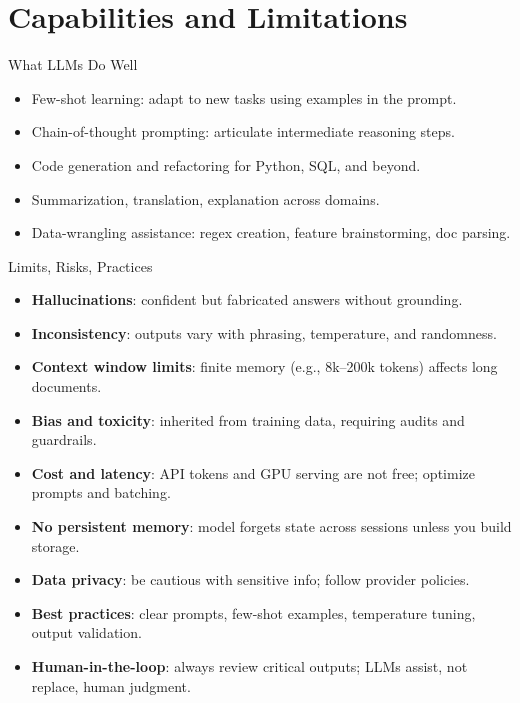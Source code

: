 \documentclass[aspectratio=169]{beamer}
\begin{document}
\section{Capabilities and Limitations}

\begin{frame}{What LLMs Do Well}
  \begin{itemize}
    \item Few-shot learning: adapt to new tasks using examples in the prompt.
    \item Chain-of-thought prompting: articulate intermediate reasoning steps.
    \item Code generation and refactoring for Python, SQL, and beyond.
    \item Summarization, translation, explanation across domains.
    \item Data-wrangling assistance: regex creation, feature brainstorming, doc parsing.
  \end{itemize}
\end{frame}

\begin{frame}{Limits, Risks, Practices}
  \begin{itemize}
    \item \textbf{Hallucinations}: confident but fabricated answers without grounding.
    \item \textbf{Inconsistency}: outputs vary with phrasing, temperature, and randomness.
    \item \textbf{Context window limits}: finite memory (e.g., 8k--200k tokens) affects long documents.
    \item \textbf{Bias and toxicity}: inherited from training data, requiring audits and guardrails.
    \item \textbf{Cost and latency}: API tokens and GPU serving are not free; optimize prompts and batching.
    \item \textbf{No persistent memory}: model forgets state across sessions unless you build storage.
    \item \textbf{Data privacy}: be cautious with sensitive info; follow provider policies.
    \item \textbf{Best practices}: clear prompts, few-shot examples, temperature tuning, output validation.
    \item \textbf{Human-in-the-loop}: always review critical outputs; LLMs assist, not replace, human judgment.
  \end{itemize}
\end{frame}
\end{document}
